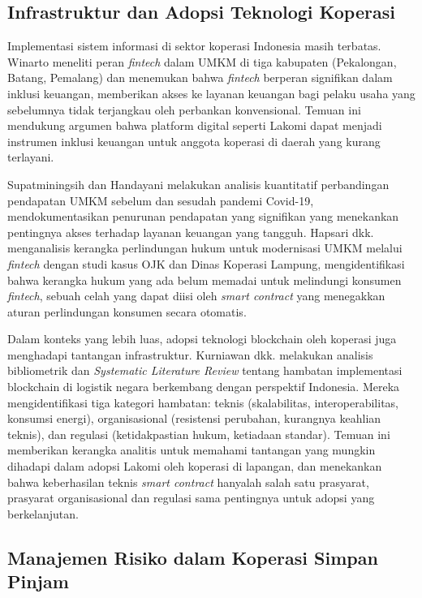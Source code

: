 \subsection{Infrastruktur dan Adopsi Teknologi Koperasi}

Implementasi sistem informasi di sektor koperasi Indonesia masih terbatas. Winarto \cite{winarto2020peran} meneliti peran \textit{fintech} dalam UMKM di tiga kabupaten (Pekalongan, Batang, Pemalang) dan menemukan bahwa \textit{fintech} berperan signifikan dalam inklusi keuangan, memberikan akses ke layanan keuangan bagi pelaku usaha yang sebelumnya tidak terjangkau oleh perbankan konvensional. Temuan ini mendukung argumen bahwa platform digital seperti Lakomi dapat menjadi instrumen inklusi keuangan untuk anggota koperasi di daerah yang kurang terlayani.

Supatminingsih dan Handayani \cite{supatminingsih2025statistik} melakukan analisis kuantitatif perbandingan pendapatan UMKM sebelum dan sesudah pandemi Covid-19, mendokumentasikan penurunan pendapatan yang signifikan yang menekankan pentingnya akses terhadap layanan keuangan yang tangguh. Hapsari dkk. \cite{hapsari2022perlindungan} menganalisis kerangka perlindungan hukum untuk modernisasi UMKM melalui \textit{fintech} dengan studi kasus OJK dan Dinas Koperasi Lampung, mengidentifikasi bahwa kerangka hukum yang ada belum memadai untuk melindungi konsumen \textit{fintech}, sebuah celah yang dapat diisi oleh \textit{smart contract} yang menegakkan aturan perlindungan konsumen secara otomatis.

Dalam konteks yang lebih luas, adopsi teknologi blockchain oleh koperasi juga menghadapi tantangan infrastruktur. Kurniawan dkk. \cite{kurniawan2026analisis} melakukan analisis bibliometrik dan \textit{Systematic Literature Review} tentang hambatan implementasi blockchain di logistik negara berkembang dengan perspektif Indonesia. Mereka mengidentifikasi tiga kategori hambatan: teknis (skalabilitas, interoperabilitas, konsumsi energi), organisasional (resistensi perubahan, kurangnya keahlian teknis), dan regulasi (ketidakpastian hukum, ketiadaan standar). Temuan ini memberikan kerangka analitis untuk memahami tantangan yang mungkin dihadapi dalam adopsi Lakomi oleh koperasi di lapangan, dan menekankan bahwa keberhasilan teknis \textit{smart contract} hanyalah salah satu prasyarat, prasyarat organisasional dan regulasi sama pentingnya untuk adopsi yang berkelanjutan.

\subsection{Manajemen Risiko dalam Koperasi Simpan Pinjam}

